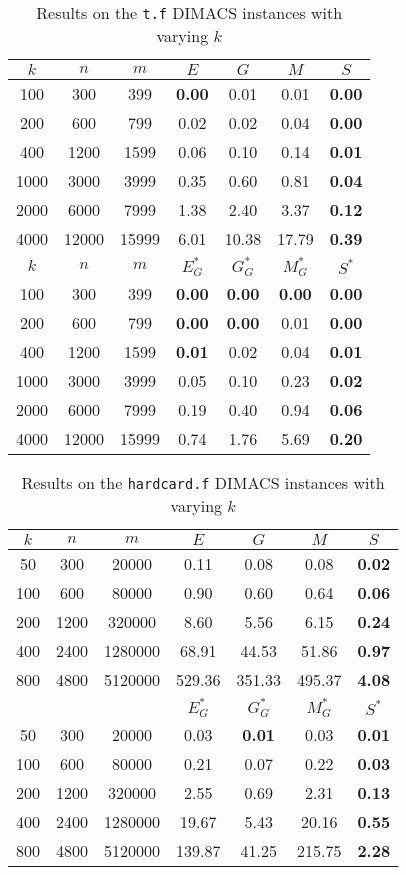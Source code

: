 \begin{table}
\centering
\begin{tabular}{
ccc|cccc}
$k$ & $n$ & $m$ & $E$ & $G$ & $M$ & $S$ \\
\hline
100 & 300 & 399 & \textbf{0.00} & 0.01 & 0.01 & \textbf{0.00} \\
200 & 600 & 799 & 0.02 & 0.02 & 0.04 & \textbf{0.00} \\
400 & 1200 & 1599 & 0.06 & 0.10 & 0.14 & \textbf{0.01} \\
1000 & 3000 & 3999 & 0.35 & 0.60 & 0.81 & \textbf{0.04} \\
2000 & 6000 & 7999 & 1.38 & 2.40 & 3.37 & \textbf{0.12} \\
4000 & 12000 & 15999 & 6.01 & 10.38 & 17.79 & \textbf{0.39} \\
\hline
$k$ & $n$ & $m$ & $E^*_G$ & $G^*_G$ & $M^*_G$ & $S^*$ \\
\hline
100 & 300 & 399 & \textbf{0.00} & \textbf{0.00} & \textbf{0.00} & \textbf{0.00} \\
200 & 600 & 799 & \textbf{0.00} & \textbf{0.00} & 0.01 & \textbf{0.00} \\
400 & 1200 & 1599 & \textbf{0.01} & 0.02 & 0.04 & \textbf{0.01} \\
1000 & 3000 & 3999 & 0.05 & 0.10 & 0.23 & \textbf{0.02} \\
2000 & 6000 & 7999 & 0.19 & 0.40 & 0.94 & \textbf{0.06} \\
4000 & 12000 & 15999 & 0.74 & 1.76 & 5.69 & \textbf{0.20} \\
\end{tabular}
\caption{Results on the \texttt{t.f} DIMACS instances with varying $k$}\label{tab:t}
\end{table}

\begin{table}
\centering
\begin{tabular}{
ccc|cccc}
$k$ & $n$ & $m$ & $E$ & $G$ & $M$ & $S$ \\
\hline
50 & 300 & 20000 & 0.11 & 0.08 & 0.08 & \textbf{0.02} \\
100 & 600 & 80000 & 0.90 & 0.60 & 0.64 & \textbf{0.06} \\
200 & 1200 & 320000 & 8.60 & 5.56 & 6.15 & \textbf{0.24} \\
400 & 2400 & 1280000 & 68.91 & 44.53 & 51.86 & \textbf{0.97} \\
800 & 4800 & 5120000 & 529.36 & 351.33 & 495.37 & \textbf{4.08} \\
\hline
& & & $E^*_G$ & $G^*_G$ & $M^*_G$ & $S^*$ \\
\hline
50 & 300 & 20000 & 0.03 & \textbf{0.01} & 0.03 & \textbf{0.01} \\
100 & 600 & 80000 & 0.21 & 0.07 & 0.22 & \textbf{0.03} \\
200 & 1200 & 320000 & 2.55 & 0.69 & 2.31 & \textbf{0.13} \\
400 & 2400 & 1280000 & 19.67 & 5.43 & 20.16 & \textbf{0.55} \\
800 & 4800 & 5120000 & 139.87 & 41.25 & 215.75 & \textbf{2.28} \\
\end{tabular}
\caption{Results on the \texttt{hardcard.f} DIMACS instances with varying $k$}\label{tab:hardcard}
\end{table}